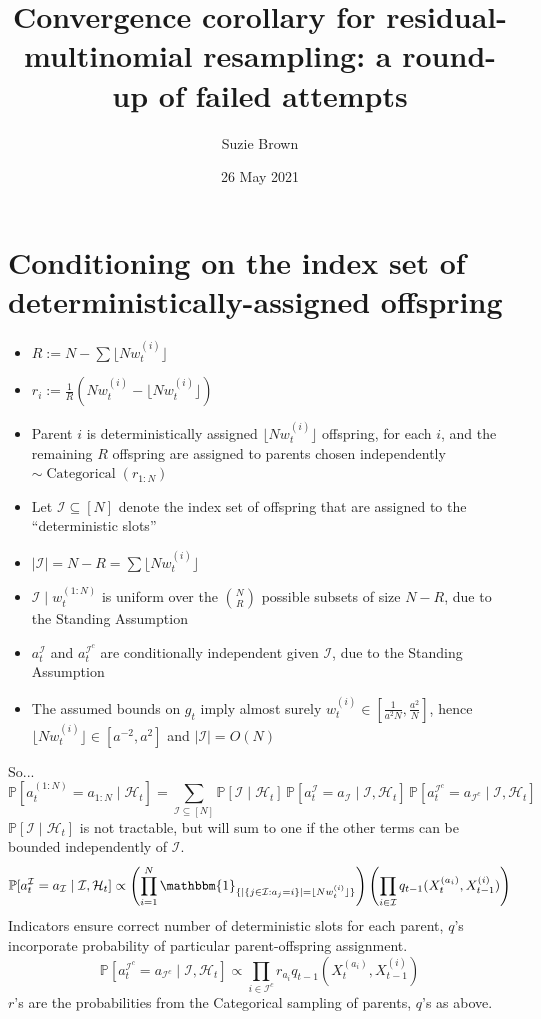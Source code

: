 \documentclass{article}
\title{Convergence corollary for residual-multinomial resampling: a round-up of failed attempts}
\author{Suzie Brown}
\date{26 May 2021}
\newcommand{\Prob}{\mathbb{P}}
\newcommand{\I}[1]{\mathbbm{1}_{\{#1\}}}
\newcommand{\1}[1]{\mathbbm{1}_{#1}}
\newcommand{\flnw}[1][i]{\lfloor N w_t^{(#1)} \rfloor}
\newcommand{\Cat}{\operatorname{Categorical}}
\begin{document}
\maketitle
\thispagestyle{fancy}


\section{Conditioning on the index set of deterministically-assigned offspring}

\begin{itemize}
\item $R:= N - \sum \flnw$ 
\item $r_i := \frac{1}{R} ( Nw_t^{(i)} - \flnw )$
\item Parent $i$ is deterministically assigned $\flnw$ offspring, for each $i$, and the remaining $R$ offspring are assigned to parents chosen independently $\sim \Cat(r_{1:N})$
\item Let $\mathcal{I} \subseteq [N]$ denote the index set of offspring that are assigned to the ``deterministic slots''
\item $|\mathcal{I}| = N-R = \sum \flnw$
\item $\mathcal{I} \mid w_t^{(1:N)}$ is uniform over the $\binom{N}{R}$ possible subsets of size $N-R$, due to the Standing Assumption
\item $a_t^{\mathcal{I}}$ and $a_t^{\mathcal{I}^c}$ are conditionally independent given $\mathcal{I}$, due to the Standing Assumption
\item The assumed bounds on $g_t$ imply almost surely $w_t^{(i)} \in [ \frac{1}{a^2 N}, \frac{a^2}{N} ]$, hence $\flnw \in [a^{-2}, a^2] $ and $|\mathcal{I}|= O(N)$
\end{itemize}
So...
\begin{equation}
\Prob[ a_t^{(1:N)} = a_{1:N} \mid \mathcal{H}_t ]
= \sum_{\mathcal{I}\subseteq[N]} \Prob[ \mathcal{I} \mid \mathcal{H}_t ]
        \, \Prob[ a_t^{\mathcal{I}} = a_{\mathcal{I}} \mid \mathcal{I}, \mathcal{H}_t ]
        \, \Prob[ a_t^{\mathcal{I}^c} = a_{\mathcal{I}^c} \mid \mathcal{I}, \mathcal{H}_t ]
\end{equation}
$\Prob[ \mathcal{I} \mid \mathcal{H}_t ]$ is not tractable, but will sum to one if the other terms can be bounded independently of $\mathcal{I}$.
\begin{equation}
\Prob[ a_t^{\mathcal{I}} = a_{\mathcal{I}} \mid \mathcal{I}, \mathcal{H}_t ]
\propto \left( \prod_{i=1}^N \I{ |\{ j \in \mathcal{I} : a_j =i \}| = \flnw } \right)
        \left( \prod_{i\in\mathcal{I}} q_{t-1}(X_t^{(a_i)}, X_{t-1}^{(i)} ) \right)
\end{equation}
Indicators ensure correct number of deterministic slots for each parent, $q$'s incorporate probability of particular parent-offspring assignment.
\begin{equation}
\Prob[ a_t^{\mathcal{I}^c} = a_{\mathcal{I}^c} \mid \mathcal{I}, \mathcal{H}_t ]
\propto \prod_{i\in\mathcal{I}^c} r_{a_i} q_{t-1}(X_t^{(a_i)}, X_{t-1}^{(i)} ) 
\end{equation}
$r$'s are the probabilities from the Categorical sampling of parents, $q$'s as above.
\end{document}
